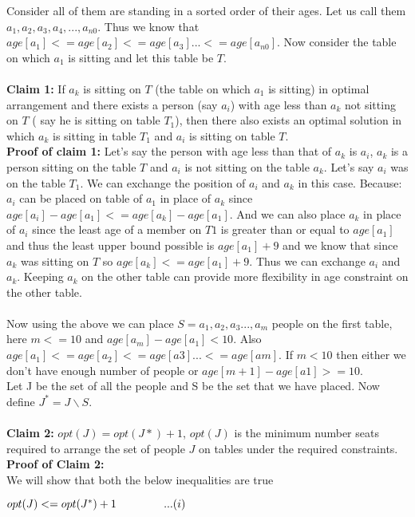 \documentclass{article}
\begin{document}
Consider all of them are standing in a sorted order of their ages. Let us call them $a_1, a_2, a_3, a_4, ... , a_{n0}$. Thus we know that $age[a_1] <= age[a_2] <= age[a_3] ... <= age[a_{n0}]$. Now consider the table on which $a_1$ is sitting and let this table be $T$.
\\\\
\textbf{Claim 1:} If $a_k$ is sitting on $T$ (the table on which $a_1$ is sitting) in optimal arrangement and there exists a person (say $a_i$) with age less than $a_k$ not sitting on $T$ ( say he is sitting on table $T_1$), then there also exists an optimal solution in which $a_k$ is sitting in table $T_1$ and $a_i$ is sitting on table $T$.\\
\textbf{Proof of claim 1:} Let's say the person with age less than that of $a_k$ is $a_i$, $a_k$ is a person sitting on the table $T$ and $a_i$ is not sitting on the table $a_k$. Let's say $a_i$ was on the table $T_1$. We can exchange the position of $a_i$ and $a_k$ in this case. Because: $a_i$ can be placed on table of $a_1$ in place of $a_k$ since $age[a_i] - age[a_1] <= age[a_k] - age[a_1]$. And we can also place $a_k$ in place of $a_i$ since the least age of a member on $T1$ is greater than or equal to $age[a_1]$ and thus the least upper bound possible is $age[a_1]+9$ and we know that since $a_k$ was sitting on $T$ so $age[a_k] <= age[a_1] + 9$. Thus we can exchange $a_i$ and $a_k$. Keeping $a_k$ on the other table can provide more flexibility in age constraint on the other table.
\\\\
Now using the above we can place $S= {a_1, a_2, a_3 ... , a_m}$ people on the first table, here $m <=10$ and $age[a_m] - age[a_1] <10$. Also $age[a_1] <= age[a_2] <= age[a3] ... <= age[am]$. If $m< 10$ then either we don't have enough number of people or $age[m+1] - age[a1] >=10$. 
\\
Let J be the set of all the people and S be the set that we have placed. Now define $J^* = J\backslash S$.
\\\\
\textbf{Claim 2:} $opt(J) = opt(J*) +1$, $opt(J)$ is the minimum number seats required to arrange the set of people $J$ on tables under the required constraints.\\
\textbf{Proof of Claim 2:}\\
We will show that both the below inequalities are true

$opt(J) <= opt(J^*) +1\hspace{1.5 cm}...(i)$
\end{document}
